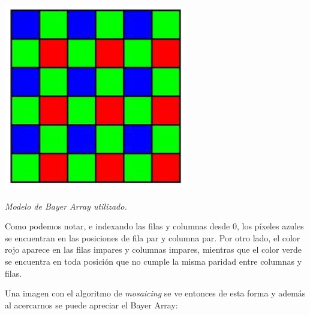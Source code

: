 	\par 
	\begin{center}
		\includegraphics[scale=0.4]{./img/bayerarray.png}
		\par 
		\footnotesize\textit{Modelo de Bayer Array utilizado.}
	\end{center}
	\par 
	
Como podemos notar, e indexando las filas y columnas desde 0, los píxeles azules se encuentran en las posiciones de fila par y columna par. Por otro lado, el color rojo aparece en las filas impares y columnas impares, mientras que el color verde se encuentra en toda posición que no cumple la misma paridad entre columnas y filas.
\par 

Una imagen con el algoritmo de \textit{mosaicing} se ve entonces de esta forma y además al acercarnos se puede apreciar el Bayer Array: 

